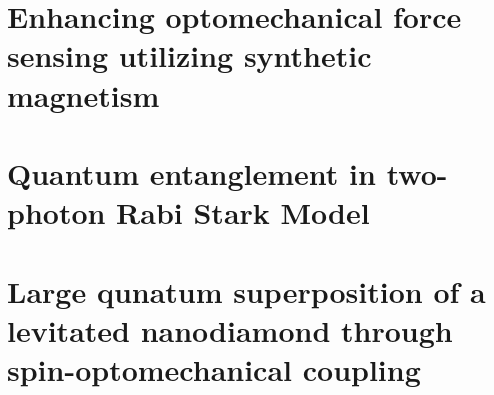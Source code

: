 \documentclass{report}
\begin{document}
  \chapter{Enhancing optomechanical force sensing utilizing synthetic magnetism}
    
  \chapter{Quantum entanglement in two-photon Rabi Stark Model}
    
  \chapter{Large qunatum superposition of a levitated nanodiamond through spin-optomechanical coupling}
    
  \appendix
\end{document}
